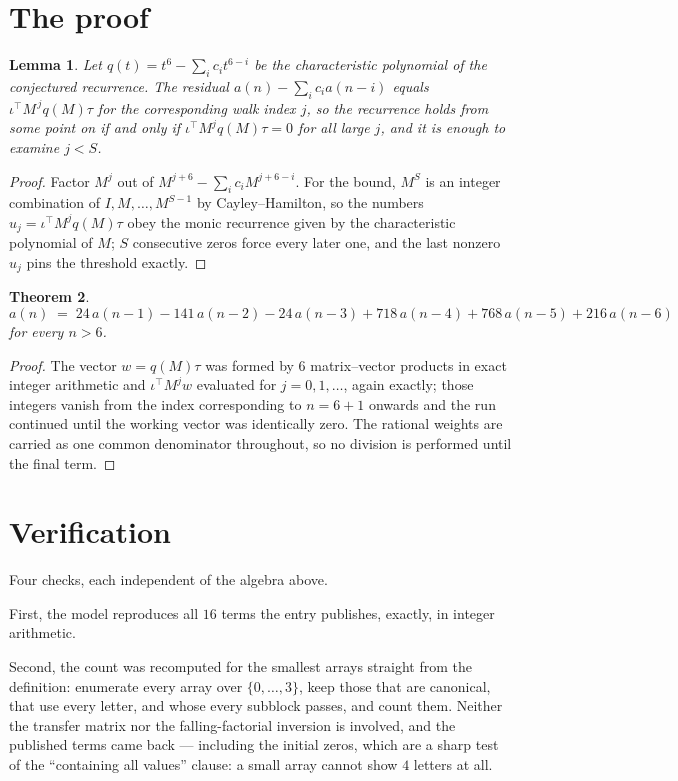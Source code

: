 \documentclass[11pt,a4paper]{article}
\theoremstyle{plain}
\newtheorem{theorem}{Theorem}
\newtheorem{lemma}[theorem]{Lemma}
\theoremstyle{definition}
\begin{document}
\section{The proof}

\begin{lemma}\label{lem:crit}
Let $q(t)=t^{6}-\sum_i c_it^{6-i}$ be the characteristic polynomial of the
conjectured recurrence. The residual $a(n)-\sum_ic_ia(n-i)$ equals
$\iota^{\!\top}M^{\,j}q(M)\tau$ for the corresponding walk index $j$, so the recurrence
holds from some point on if and only if $\iota^{\!\top}M^{j}q(M)\tau=0$ for all large $j$,
and it is enough to examine $j<S$.
\end{lemma}

\begin{proof}
Factor $M^{j}$ out of $M^{j+6}-\sum_ic_iM^{j+6-i}$. For the bound, $M^{S}$
is an integer combination of $I,M,\dots,M^{S-1}$ by Cayley--Hamilton, so the numbers
$u_j=\iota^{\!\top}M^{j}q(M)\tau$ obey the monic recurrence given by the characteristic
polynomial of $M$; $S$ consecutive zeros force every later one, and the last nonzero $u_j$
pins the threshold exactly.
\end{proof}

\begin{theorem}
\[
a(n)\;=\;24\,a(n-1) - 141\,a(n-2) - 24\,a(n-3) + 718\,a(n-4) + 768\,a(n-5) + 216\,a(n-6)
\]
for every $n>6$.
\end{theorem}

\begin{proof}
The vector $w=q(M)\tau$ was formed by $6$ matrix--vector products in exact integer
arithmetic and $\iota^{\!\top}M^{j}w$ evaluated for $j=0,1,\dots$, again exactly; those
integers vanish from the index corresponding to $n=6+1$ onwards and the run continued
until the working vector was identically zero. The rational weights are carried as one common
denominator throughout, so no division is performed until the final term.
\end{proof}

\section{Verification}

Four checks, each independent of the algebra above.

First, the model reproduces all $16$ terms the entry publishes, exactly, in integer
arithmetic.

Second, the count was recomputed for the smallest arrays straight from the definition:
enumerate every array over $\{0,\dots,3\}$, keep those that are canonical, that use every
letter, and whose every subblock passes, and count them. Neither the transfer matrix nor the
falling-factorial inversion is involved, and the published terms came back --- including the
initial zeros, which are a sharp test of the ``containing all values'' clause: a small array
cannot show $4$ letters at all.
\end{document}
